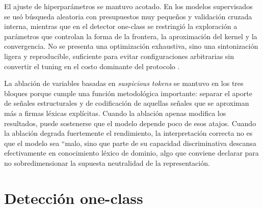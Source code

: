 \documentclass[12pt,oneside]{report}
\begin{document}
El ajuste de hiperparámetros se mantuvo acotado. En los modelos supervisados se usó búsqueda aleatoria con presupuestos muy pequeños y validación cruzada interna, mientras que en el detector one-class se restringió la exploración a parámetros que controlan la forma de la frontera, la aproximación del kernel y la convergencia. No se presenta una optimización exhaustiva, sino una sintonización ligera y reproducible, suficiente para evitar configuraciones arbitrarias sin convertir el tuning en el costo dominante del protocolo \cite{bergstra2012,sklearn_randomsearch}.\

La ablación de variables basadas en \textit{suspicious tokens} se mantuvo en los tres bloques porque cumple una función metodológica importante: separar el aporte de señales estructurales y de codificación de aquellas señales que se aproximan más a firmas léxicas explícitas. Cuando la ablación apenas modifica los resultados, puede sostenerse que el modelo depende poco de esos atajos. Cuando la ablación degrada fuertemente el rendimiento, la interpretación correcta no es que el modelo sea ``malo, sino que parte de su capacidad discriminativa descansa efectivamente en conocimiento léxico de dominio, algo que conviene declarar para no sobredimensionar la supuesta neutralidad de la representación.\

\section{Detección one-class}
\end{document}
